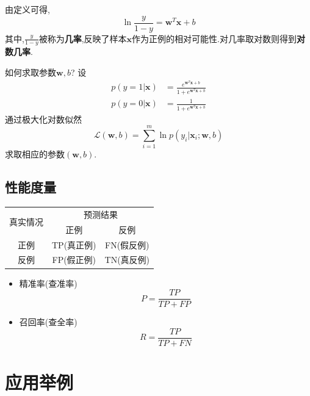 \documentclass{beamer}
\begin{document}
    \begin{frame}
        由定义可得,$$\ln\frac{y}{1-y}=\bm w^T\bm x+b$$
        其中,$\frac{y}{1-y}$被称为\textbf{几率},反映了样本$\bm x$作为正例的相对可能性.对几率取对数则得到\textbf{对数几率}.

        如何求取参数$\bm w,b$?
    设\begin{equation*}\begin{split}
    p(y=1|\bm x)&=\frac{e^{\bm w^T\bm x+b}}{1+e^{\bm w^T\bm x+b}}\\
    p(y=0|\bm x)&=\frac{1}{1+e^{\bm w^T\bm x+b}}
    \end{split}\end{equation*}
    通过极大化对数似然$$\mathcal L(\bm w,b)=\sum_{i=1}^m\ln p(y_i|\bm x_i;\bm w,b)$$求取相应的参数$(\bm w,b)$.
    \end{frame}

    \subsection{性能度量}
    \begin{frame}
        \begin{center}\begin{tabular}{|c|c|c|}
            \hline
            \multirow{2}{*}{真实情况} &
            \multicolumn{2}{c|}{预测结果}\\
            \cline{2-3}
              & 正例 & 反例 \\
            \hline
            正例 & TP(真正例) & FN(假反例) \\
            \hline
            反例 & FP(假正例) & TN(真反例) \\
            \hline
            \end{tabular}\end{center}
        \begin{itemize}
            \item 精准率(查准率)$$P=\frac{TP}{TP+FP}$$
            \item 召回率(查全率)$$R=\frac{TP}{TP+FN}$$
        \end{itemize}
    \end{frame}

\section{应用举例}
\end{document}
